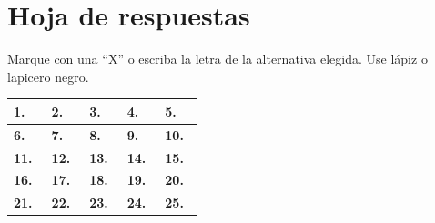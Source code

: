 \newpage
\section*{Hoja de respuestas}

\noindent Marque con una ``X'' o escriba la letra de la alternativa elegida. Use lápiz o lapicero negro.

\vspace{0.4cm}
\begin{center}
\renewcommand{\arraystretch}{1.9}
\begin{tabular}{|p{2.7cm}|p{2.7cm}|p{2.7cm}|p{2.7cm}|p{2.7cm}|}
\hline
\textbf{1.}\ \underline{\hspace{1.3cm}} & \textbf{2.}\ \underline{\hspace{1.3cm}} & \textbf{3.}\ \underline{\hspace{1.3cm}} & \textbf{4.}\ \underline{\hspace{1.3cm}} & \textbf{5.}\ \underline{\hspace{1.3cm}} \\
\hline
\textbf{6.}\ \underline{\hspace{1.3cm}} & \textbf{7.}\ \underline{\hspace{1.3cm}} & \textbf{8.}\ \underline{\hspace{1.3cm}} & \textbf{9.}\ \underline{\hspace{1.3cm}} & \textbf{10.}\ \underline{\hspace{1.3cm}} \\
\hline
\textbf{11.}\ \underline{\hspace{1.3cm}} & \textbf{12.}\ \underline{\hspace{1.3cm}} & \textbf{13.}\ \underline{\hspace{1.3cm}} & \textbf{14.}\ \underline{\hspace{1.3cm}} & \textbf{15.}\ \underline{\hspace{1.3cm}} \\
\hline
\textbf{16.}\ \underline{\hspace{1.3cm}} & \textbf{17.}\ \underline{\hspace{1.3cm}} & \textbf{18.}\ \underline{\hspace{1.3cm}} & \textbf{19.}\ \underline{\hspace{1.3cm}} & \textbf{20.}\ \underline{\hspace{1.3cm}} \\
\hline
\textbf{21.}\ \underline{\hspace{1.3cm}} & \textbf{22.}\ \underline{\hspace{1.3cm}} & \textbf{23.}\ \underline{\hspace{1.3cm}} & \textbf{24.}\ \underline{\hspace{1.3cm}} & \textbf{25.}\ \underline{\hspace{1.3cm}} \\

\end{tabular}
\end{center}
